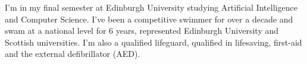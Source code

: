 

\begin{cvparagraph}

    I'm in my final semester at Edinburgh University studying Artificial Intelligence and Computer Science. I've been a competitive swimmer for over a decade and swam at a national level for 6 years, represented Edinburgh University and Scottish universities. I'm also a qualified lifeguard, qualified in lifesaving, first-aid and the external defibrillator (AED).

\end{cvparagraph}


